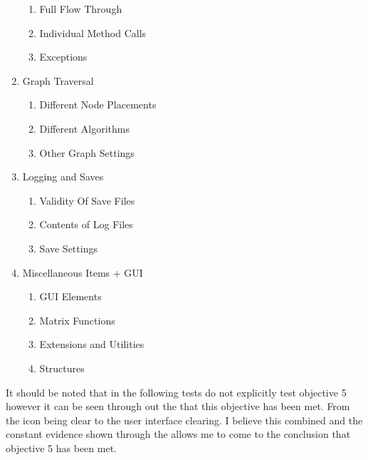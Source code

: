 \begin{flushleft}
\begin{enumerate}
\begin{enumerate}
            \item Full Flow Through
            \item Individual Method Calls
            \item Exceptions
        \end{enumerate}\bk
        \item Graph Traversal
        \begin{enumerate}
            \item Different Node Placements
            \item Different Algorithms
            \item Other Graph Settings
        \end{enumerate}\bk
        \item Logging and Saves
        \begin{enumerate}
            \item Validity Of Save Files
            \item Contents of Log Files
            \item Save Settings
        \end{enumerate}\bk
        \item Miscellaneous Items + GUI
        \begin{enumerate}
            \item GUI Elements
            \item Matrix Functions
            \item Extensions and Utilities 
            \item Structures
        \end{enumerate}
    \end{enumerate}
    \bk

    It should be noted that in the following tests do not explicitly test objective 5 however it can be seen through out the that this objective has been met. From the icon being clear to the user interface clearing. I believe this combined and the constant evidence shown through the allows me to come to the conclusion that objective 5 has been met.

    \bk
    \setlength\LTpre{0pt}
    \pagebreak

\end{flushleft}
